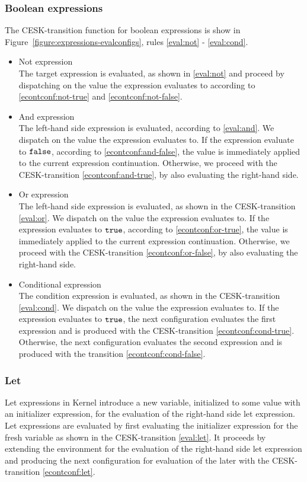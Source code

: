 \documentclass{article}
\begin{document}
\subsubsection{Boolean expressions}
\label{subsubsec:bool-expressions}
The CESK-transition function for boolean expressions is show in Figure~\ref{figure:expressions-evalconfigs}, rules \eqref{eval:not} - \eqref{eval:cond}.
\begin{itemize}
\item Not expression\\
The target expression is evaluated, as shown in \eqref{eval:not} and proceed by dispatching on the value the expression evaluates to according to \eqref{econtconf:not-true} and \eqref{econtconf:not-false}.
\item And expression\\
The left-hand side expression is evaluated, according to \eqref{eval:and}.
We dispatch on the value the expression evaluates to.
If the expression evaluate to $\tt{false}$, according to \eqref{econtconf:and-false}, the value is immediately applied to the current expression continuation.
Otherwise, we proceed with the CESK-transition \eqref{econtconf:and-true}, by also evaluating the right-hand side.
\item Or expression\\
The left-hand side expression is evaluated, as shown in the CESK-transition \eqref{eval:or}.
We dispatch on the value the expression evaluates to.
If the expression evaluates to $\tt{true}$, according to \eqref{econtconf:or-true}, the value is immediately applied to the current expression continuation.
Otherwise, we proceed with the CESK-transition \eqref{econtconf:or-false}, by also evaluating the right-hand side.
\item Conditional expression\\
The condition expression is evaluated, as shown in the CESK-transition \eqref{eval:cond}.
We dispatch on the value the expression evaluates to.
If the expression evaluates to $\tt{true}$, the next configuration evaluates the first expression and is produced with the CESK-transition \eqref{econtconf:cond-true}.
Otherwise, the next configuration evaluates the second expression and is produced with the transition \eqref{econtconf:cond-false}.
\end{itemize}
\subsubsection{Let}
Let expressions in Kernel introduce a new variable, initialized to some value with an initializer expression, for the evaluation of the right-hand side let expression.
Let expressions are evaluated by first evaluating the initializer expression for the fresh variable as shown in the CESK-transition \eqref{eval:let}.
It proceeds by extending the environment for the evaluation of the right-hand side let expression and producing the next configuration for evaluation of the later with the CESK-transition \eqref{econtconf:let}.
\end{document}
